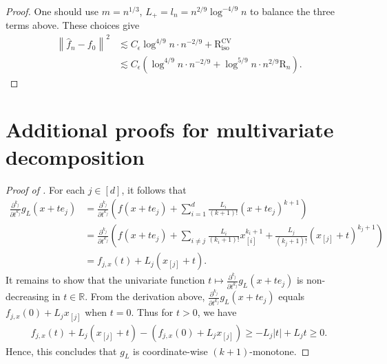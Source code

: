 \documentclass[12pt]{article}
\begin{document}
\begin{appendices}
\begin{proof}
One should use $m = n^{1/3}$, $L_+ = l_n = n^{2/9}\log^{-4/9} n$ to balance the three terms above. These choices give
\begin{equation*}
\begin{aligned}
\left\|\widehat{f}_n-f_0\right\|^2 & \lesssim C_\epsilon \log ^{4 / 9} n \cdot n^{-2 / 9}+\mathrm{R}_{\mathrm{iso}}^{\mathrm{CV}} \\
& \lesssim C_\epsilon\left(\log ^{4 / 9} n \cdot n^{-2 / 9}+\log ^{5 / 9} n \cdot n^{2 / 9} \mathrm{R}_n\right).
\end{aligned}
\end{equation*}
\end{proof}


\newpage
\section{Additional proofs for multivariate decomposition}\label{app: proof of coordinate-deriv}
\begin{proof}[Proof of ]
    For each $j \in [d]$, it follows that 
    \begin{align*}
        \frac{\partial^{k_j}}{\partial t^{k_j}} g_L (x+te_j) &=\frac{\partial^{k_j}}{\partial t^{k_j}} \left(f(x+te_j) +  \sum_{i=1}^d \frac{L_i}{(k+1)!}(x+te_j)^{k+1}\right)\\
        &=\frac{\partial^{k_j}}{\partial t^{k_j}} \left(f(x+te_j) +  \sum_{i\neq j} \frac{L_i}{(k_i+1)!}x_{[i]}^{k_i+1}+ \frac{L_j}{(k_j+1)!}(x_{[j]}+t)^{k_j+1}\right)\\
        &= f_{j,x}(t) + L_j (x_{[j]}+t).
    \end{align*}
    It remains to show that the univariate function $t \mapsto \frac{\partial^{k_j}}{\partial t^{k_j}} g_L (x+te_j)$ is non-decreasing in $t \in\mathbb{R}$. From the derivation above, $\frac{\partial^{k_j}}{\partial t^{k_j}} g_L (x+te_j)$ equals $f_{j,x}(0) + L_j x_{[j]}$ when $t=0$. Thus for $t > 0$, we have  
    \begin{align*}
         f_{j,x}(t) + L_j (x_{[j]} + t) - (f_{j,x}(0) +  L_j x_{[j]})  \ge -L_j |t| + L_j t \ge 0.
    \end{align*}
    Hence, this concludes that $g_L$ is coordinate-wise $(k+1)$-monotone. 
\end{proof}


\end{appendices}
\end{document}
